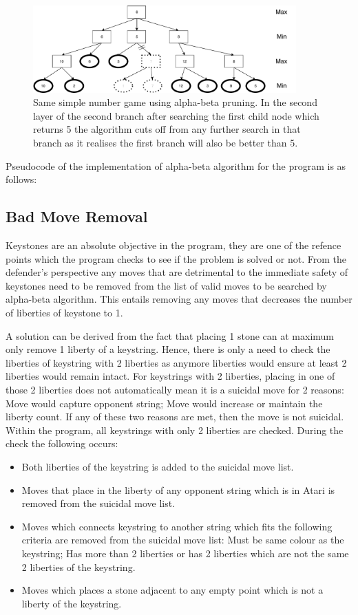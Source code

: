 \documentclass{l4proj}
\begin{document}
\begin{figure}[!h]
\centering
\includegraphics[width=0.9\textwidth]{ABNumTree}
\caption{Same simple number game using alpha-beta pruning. In the second layer of the second branch after searching the first child node which returns 5 the algorithm cuts off from any further search in that branch as it realises the first branch will also be better than 5. }
\label{fig:ABNumTree}
\end{figure}

Pseudocode of the implementation of alpha-beta algorithm for the program is as follows:

\subsection{Bad Move Removal}
Keystones are an absolute objective in the program, they are one of the refence points which the program checks to see if the problem is solved or not. From the defender’s perspective any moves that are detrimental to the immediate safety of keystones need to be removed from the list of valid moves to be searched by alpha-beta algorithm. This entails removing any moves that decreases the number of liberties of keystone to 1.

A solution can be derived from the fact that placing 1 stone can at maximum only remove 1 liberty of a keystring. Hence, there is only a need to check the liberties of keystring with 2 liberties as anymore liberties would ensure at least 2 liberties would remain intact. For keystrings with 2 liberties, placing in one of those 2 liberties does not automatically mean it is a suicidal move for 2 reasons: Move would capture opponent string; Move would increase or maintain the liberty count. If any of these two reasons are met, then the move is not suicidal.
Within the program, all keystrings with only 2 liberties are checked. During the check the following occurs:
\begin{itemize}
	\item Both liberties of the keystring is added to the suicidal move list.
	\item Moves that place in the liberty of any opponent string which is in Atari is removed from the suicidal move list.
    \item 	Moves which connects keystring to another string which fits the following criteria are removed from the suicidal move list: Must be same colour as the keystring; Has more than 2 liberties or has 2 liberties which are not the same 2 liberties of the keystring.
    \item Moves which places a stone adjacent to any empty point which is not a liberty of the keystring.
\end{itemize}
\end{document}
